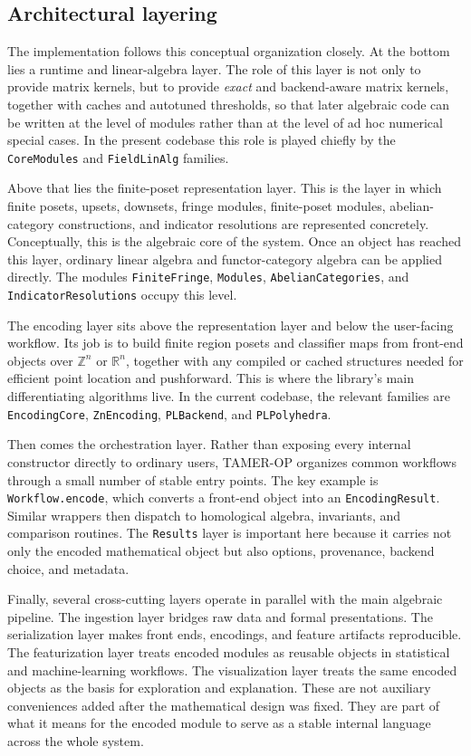 \documentclass[11pt]{article}
\newcommand{\TAMER}{\textsc{TAMER-OP}}
\theoremstyle{definition}
\theoremstyle{remark}
\begin{document}
\subsection{Architectural layering}

The implementation follows this conceptual organization closely.  At the bottom lies a runtime and linear-algebra layer.  The role of this layer is not only to provide matrix kernels, but to provide \emph{exact} and backend-aware matrix kernels, together with caches and autotuned thresholds, so that later algebraic code can be written at the level of modules rather than at the level of ad hoc numerical special cases.  In the present codebase this role is played chiefly by the \texttt{CoreModules} and \texttt{FieldLinAlg} families.

Above that lies the finite-poset representation layer.  This is the layer in which finite posets, upsets, downsets, fringe modules, finite-poset modules, abelian-category constructions, and indicator resolutions are represented concretely.  Conceptually, this is the algebraic core of the system.  Once an object has reached this layer, ordinary linear algebra and functor-category algebra can be applied directly.  The modules \texttt{FiniteFringe}, \texttt{Modules}, \texttt{AbelianCategories}, and \texttt{IndicatorResolutions} occupy this level.

The encoding layer sits above the representation layer and below the user-facing workflow.  Its job is to build finite region posets and classifier maps from front-end objects over $\mathbb{Z}^n$ or $\mathbb{R}^n$, together with any compiled or cached structures needed for efficient point location and pushforward.  This is where the library's main differentiating algorithms live.  In the current codebase, the relevant families are \texttt{EncodingCore}, \texttt{ZnEncoding}, \texttt{PLBackend}, and \texttt{PLPolyhedra}.

Then comes the orchestration layer.  Rather than exposing every internal constructor directly to ordinary users, \TAMER{} organizes common workflows through a small number of stable entry points.  The key example is \texttt{Workflow.encode}, which converts a front-end object into an \texttt{EncodingResult}.  Similar wrappers then dispatch to homological algebra, invariants, and comparison routines.  The \texttt{Results} layer is important here because it carries not only the encoded mathematical object but also options, provenance, backend choice, and metadata.

Finally, several cross-cutting layers operate in parallel with the main algebraic pipeline.  The ingestion layer bridges raw data and formal presentations.  The serialization layer makes front ends, encodings, and feature artifacts reproducible.  The featurization layer treats encoded modules as reusable objects in statistical and machine-learning workflows.  The visualization layer treats the same encoded objects as the basis for exploration and explanation.  These are not auxiliary conveniences added after the mathematical design was fixed.  They are part of what it means for the encoded module to serve as a stable internal language across the whole system.
\end{document}
